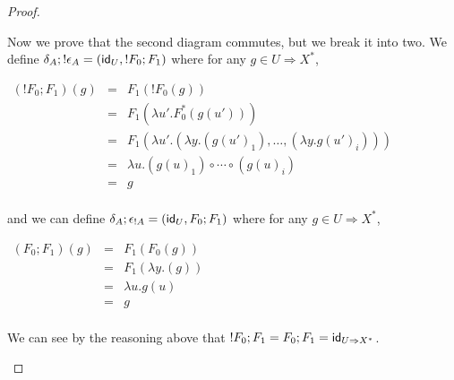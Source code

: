 \begin{proof}
\begin{center}
\begin{itemize}
      Now we prove that the second diagram commutes, but we break it
      into two.  
      We define $\delta_A;!\epsilon_A = (\mathsf{id}_U,!F_0;F_1)$ where for
      any $g \in U \Rightarrow X^*$,
      \begin{center}
        \begin{math}
          \begin{array}{lll}
            (!F_0;F_1)(g) 
            & = & F_1(!F_0(g))\\
            & = & F_1(\lambda u'.F_0^*(g(u')))\\
            & = & F_1(\lambda u'.(\lambda y.(g(u')_1),\ldots,(\lambda y.g(u')_i)))\\
            & = & \lambda u.(g(u)_1) \circ \cdots \circ (g(u)_i)\\
            & = & g\\
          \end{array}
        \end{math}
      \end{center}
      and we can define $\delta_A;\epsilon_{!A} = (\mathsf{id}_U,F_0;F_1)$ where for
      any $g \in U \Rightarrow X^*$,
      \begin{center}
        \begin{math}
          \begin{array}{lll}
            (F_0;F_1)(g) 
            & = & F_1(F_0(g))\\
            & = & F_1(\lambda y.(g))\\
            & = & \lambda u.g(u)\\
            & = & g\\
          \end{array}
        \end{math}
      \end{center}
      We can see by the reasoning above that
      $!F_0;F_1 = F_0;F_1 = \mathsf{id}_{U \Rightarrow X^*}$.


\end{itemize}
\end{center}
\end{proof}
